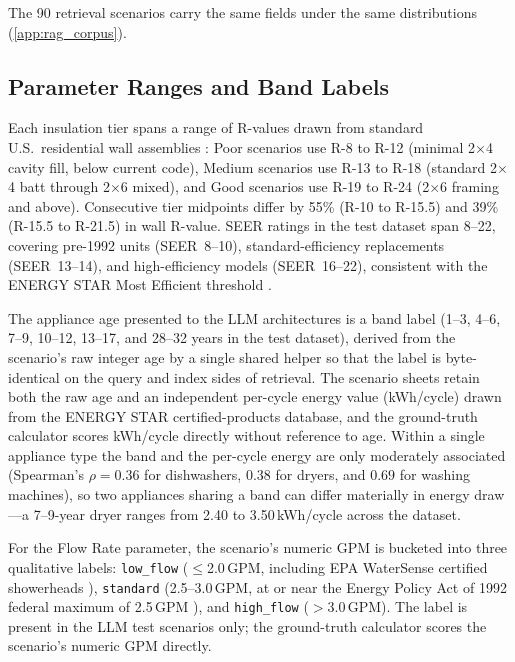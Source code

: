 \documentclass[11pt]{article}
\begin{document}
The 90 retrieval scenarios carry the same fields under the same distributions
(\ref{app:rag_corpus}).

\subsection{Parameter Ranges and Band Labels}
\label{app:parameter_ranges}

Each insulation tier spans a range of R-values drawn from standard U.S.\ residential wall assemblies \citep{cec_ja43_2013,energystar_insulation2023}: Poor scenarios use R-8 to R-12 (minimal 2$\times$4 cavity fill, below current code), Medium scenarios use R-13 to R-18 (standard 2$\times$4 batt through 2$\times$6 mixed), and Good scenarios use R-19 to R-24 (2$\times$6 framing and above). Consecutive tier midpoints differ by 55\% (R-10 to R-15.5) and 39\% (R-15.5 to R-21.5) in wall R-value. SEER ratings in the test dataset span 8--22, covering pre-1992 units (SEER~8--10), standard-efficiency replacements (SEER~13--14), and high-efficiency models (SEER~16--22), consistent with the ENERGY STAR Most Efficient threshold \citep{energystar_ac2023}.

The appliance age presented to the LLM architectures is a band label (1--3, 4--6, 7--9, 10--12, 13--17, and 28--32 years in the test dataset), derived from the scenario's raw integer age by a single shared helper so that the label is byte-identical on the query and index sides of retrieval. The scenario sheets retain both the raw age and an independent per-cycle energy value (kWh/cycle) drawn from the ENERGY STAR certified-products database, and the ground-truth calculator scores kWh/cycle directly without reference to age. Within a single appliance type the band and the per-cycle energy are only moderately associated (Spearman's $\rho = 0.36$ for dishwashers, $0.38$ for dryers, and $0.69$ for washing machines), so two appliances sharing a band can differ materially in energy draw---a 7--9-year dryer ranges from 2.40 to 3.50\,kWh/cycle across the dataset.

For the Flow Rate parameter, the scenario's numeric GPM is bucketed into three qualitative labels: \texttt{low\_flow} ($\le$2.0\,GPM, including EPA WaterSense certified showerheads \citep{epawatersense}), \texttt{standard} (2.5--3.0\,GPM, at or near the Energy Policy Act of 1992 federal maximum of 2.5\,GPM \citep{cfr430_32}), and \texttt{high\_flow} ($>$3.0\,GPM). The label is present in the LLM test scenarios only; the ground-truth calculator scores the scenario's numeric GPM directly.
\end{document}
